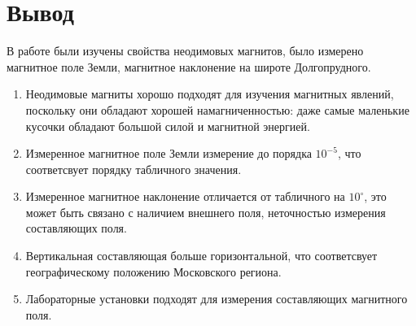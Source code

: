 \documentclass[a4paper, 10pt]{article}
\begin{document}
\section*{Вывод}
    В работе были изучены свойства неодимовых магнитов, было измерено магнитное поле Земли, магнитное наклонение на широте Долгопрудного.
    \begin{enumerate}
        \item Неодимовые магниты хорошо подходят для изучения магнитных явлений, поскольку они обладают хорошей намагниченностью: даже самые
        маленькие кусочки обладают большой силой и магнитной энергией.
        \item Измеренное магнитное поле Земли измерение до порядка $10^{-5}$, что соответсвует порядку табличного значения.
        \item Измеренное магнитное наклонение отличается от табличного на $10^{\circ}$, это может быть связано с наличием внешнего поля,
        неточностью измерения составляющих поля.
        \item Вертикальная  составляющая больше горизонтальной, что соответсвует географическому положению Московского региона.
        \item Лабораторные установки подходят для измерения составляющих магнитного поля.
    \end{enumerate}
\end{document}
